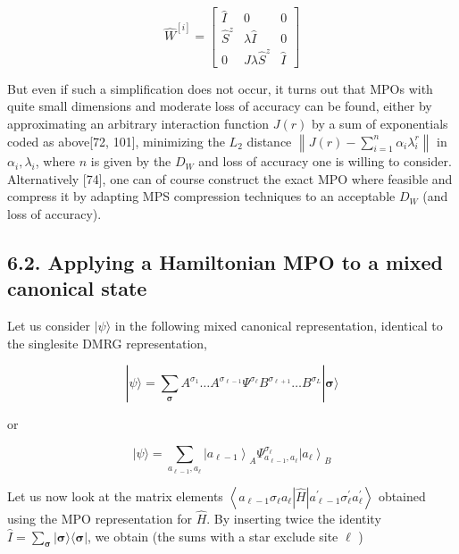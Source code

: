\documentclass[12pt]{article}
\begin{document}
\[
\hat{W}^{[i]}=\left[\begin{array}{ccc}
\hat{I} & 0 & 0  \tag{188}\\
\hat{S}^{z} & \lambda \hat{I} & 0 \\
0 & J \lambda \hat{S}^{z} & \hat{I}
\end{array}\right]
\]

But even if such a simplification does not occur, it turns out that MPOs with quite small dimensions and moderate loss of accuracy can be found, either by approximating an arbitrary interaction function $J(r)$ by a sum of exponentials coded as above[72, 101], minimizing the $L_{2}$ distance $\left\|J(r)-\sum_{i=1}^{n} \alpha_{i} \lambda_{i}^{r}\right\|$ in $\alpha_{i}, \lambda_{i}$, where $n$ is given by the $D_{W}$ and loss of accuracy one is willing to consider. Alternatively [74], one can of course construct the exact MPO where feasible and compress it by adapting MPS compression techniques to an acceptable $D_{W}$ (and loss of accuracy).

\subsection*{6.2. Applying a Hamiltonian MPO to a mixed canonical state}
Let us consider $|\psi\rangle$ in the following mixed canonical representation, identical to the singlesite DMRG representation,


\begin{equation*}
|\psi\rangle=\sum_{\boldsymbol{\sigma}} A^{\sigma_{1}} \ldots A^{\sigma_{\ell-1}} \Psi^{\sigma_{\ell}} B^{\sigma_{\ell+1}} \ldots B^{\sigma_{L}}|\boldsymbol{\sigma}\rangle \tag{189}
\end{equation*}


or


\begin{equation*}
|\psi\rangle=\sum_{a_{\ell-1}, a_{\ell}}\left|a_{\ell-1}\right\rangle_{A} \Psi_{a_{\ell-1}, a_{\ell}}^{\sigma_{\ell}}\left|a_{\ell}\right\rangle_{B} \tag{190}
\end{equation*}


Let us now look at the matrix elements $\left\langle a_{\ell-1} \sigma_{\ell} a_{\ell}|\hat{H}| a_{\ell-1}^{\prime} \sigma_{\ell}^{\prime} a_{\ell}^{\prime}\right\rangle$ obtained using the MPO representation for $\hat{H}$. By inserting twice the identity $\hat{I}=\sum_{\boldsymbol{\sigma}}|\boldsymbol{\sigma}\rangle\langle\boldsymbol{\sigma}|$, we obtain (the sums with a star exclude site $\ell$ )
\end{document}
